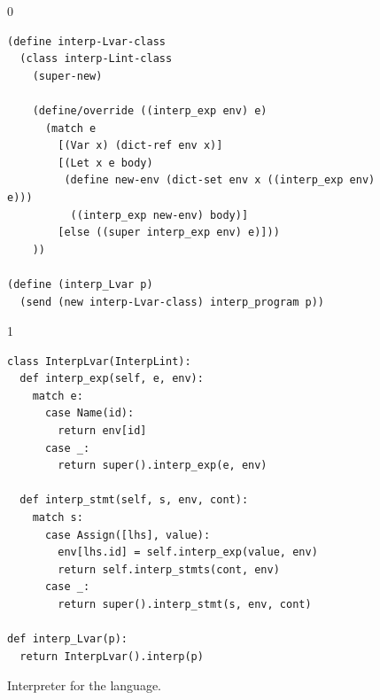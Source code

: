 \documentclass[7x10]{TimesAPriori_MIT}%
\def\racketEd{0}
\def\pythonEd{1}
\def\edition{1}
\newcommand{\pythonColor}[0]{}
\numberwithin{theorem}{chapter}
\numberwithin{definition}{chapter}
\numberwithin{equation}{chapter}
\begin{document}
\begin{figure}[tp]
\begin{tcolorbox}[colback=white]
{\if\edition\racketEd
\begin{lstlisting}
(define interp-Lvar-class
  (class interp-Lint-class
    (super-new)
    
    (define/override ((interp_exp env) e)
      (match e
        [(Var x) (dict-ref env x)]
        [(Let x e body)
         (define new-env (dict-set env x ((interp_exp env) e)))
          ((interp_exp new-env) body)]
        [else ((super interp_exp env) e)]))
    ))

(define (interp_Lvar p)
  (send (new interp-Lvar-class) interp_program p))
\end{lstlisting}
\fi}
{\if\edition\pythonEd\pythonColor
\begin{lstlisting}
class InterpLvar(InterpLint):
  def interp_exp(self, e, env):
    match e:
      case Name(id):
        return env[id]
      case _:
        return super().interp_exp(e, env)

  def interp_stmt(self, s, env, cont):
    match s:
      case Assign([lhs], value):
        env[lhs.id] = self.interp_exp(value, env)
        return self.interp_stmts(cont, env)
      case _:
        return super().interp_stmt(s, env, cont)

def interp_Lvar(p):
  return InterpLvar().interp(p)
\end{lstlisting}
\fi}
\end{tcolorbox}
\caption{Interpreter for the \LangVar{} language.}
\label{fig:interp-Lvar}
\end{figure}
\end{document}
